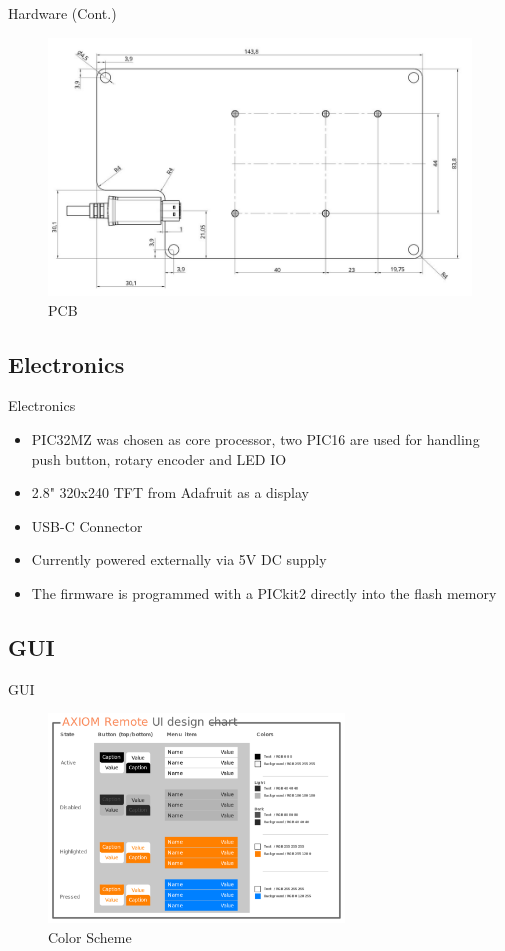 \documentclass{beamer}
\begin{document}
\begin{frame}{Hardware (Cont.)}
	\begin{center}
		\begin{figure}[h]
		    \centering
		    \includegraphics[width=0.8\linewidth]{images/Axiom_Remote_PCB.jpg}
		    \caption{PCB}
		    \label{fig:logo}
		\end{figure}
	\end{center}
\end{frame}

\subsection{Electronics}

\begin{frame}{Electronics}
	\begin{itemize}
		\item PIC32MZ was chosen as core processor, two PIC16 are used for handling push button, rotary encoder and LED IO
		\item 2.8" 320x240 TFT from Adafruit as a display
		\item USB-C Connector
		\item Currently powered externally via 5V DC supply
		\item The firmware is programmed with a PICkit2 directly into the flash memory
	\end{itemize}
\end{frame}

\subsection{GUI}

\begin{frame}{GUI}
	\begin{center}
		\begin{figure}[htbp]
		    \centering
		    \includegraphics[width=0.7\textwidth,clip]{images/AXIOM_Remote_UI_design_chart.pdf}
		    \caption{Color Scheme}
		    \label{fig:logo}
		\end{figure}
	\end{center}
\end{frame}
\end{document}
